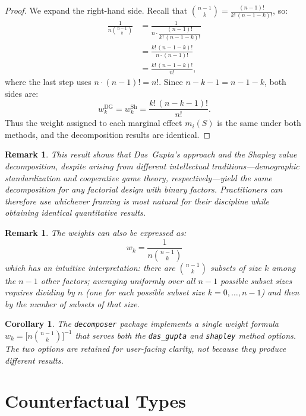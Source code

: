 \documentclass[11pt]{article}
\newtheorem{corollary}[theorem]{Corollary}
\newtheorem{remark}[theorem]{Remark}
\newcommand{\pkg}[1]{\texttt{#1}}
\newcommand{\code}[1]{\texttt{#1}}
\begin{document}
\begin{proof}
We expand the right-hand side.  Recall that
$\binom{n-1}{k} = \frac{(n-1)!}{k!\,(n-1-k)!}$, so:
\begin{align*}
  \frac{1}{n \binom{n-1}{k}}
  &= \frac{1}{n \cdot \dfrac{(n-1)!}{k!\,(n-1-k)!}}
  \\[6pt]
  &= \frac{k! \, (n - 1 - k)!}{n \cdot (n-1)!}
  \\[6pt]
  &= \frac{k! \, (n - 1 - k)!}{n!},
\end{align*}
where the last step uses $n \cdot (n-1)! = n!$.
Since $n - k - 1 = n - 1 - k$, both sides are:
\[
  w_k^{\text{DG}} = w_k^{\text{Sh}} = \frac{k!\,(n-k-1)!}{n!}.
\]
Thus the weight assigned to each marginal effect $m_i(S)$ is the same
under both methods, and the decomposition results are identical.
\end{proof}

\begin{remark}
This result shows that Das~Gupta's approach and the Shapley value
decomposition, despite arising from different intellectual
traditions---demographic standardization and cooperative game
theory, respectively---yield the same decomposition for any factorial
design with binary factors.
Practitioners can therefore use whichever framing is most natural for
their discipline while obtaining identical quantitative results.
\end{remark}

\begin{remark}
The weights can also be expressed as:
\[
  w_k = \frac{1}{n \binom{n-1}{k}}
\]
which has an intuitive interpretation: there are $\binom{n-1}{k}$
subsets of size $k$ among the $n-1$ other factors; averaging uniformly
over all $n-1$ possible subset sizes requires dividing by $n$ (one for
each possible subset size $k = 0, \ldots, n-1$) and then by the number
of subsets of that size.
\end{remark}

\begin{corollary}
The \pkg{decomposer} package implements a single weight formula
$w_k = \bigl[n \binom{n-1}{k}\bigr]^{-1}$ that serves both the
\code{das\_gupta} and \code{shapley} method options.
The two options are retained for user-facing clarity, not because they
produce different results.
\end{corollary}


\section{Counterfactual Types}
\label{sec:counterfactual}
\end{document}
